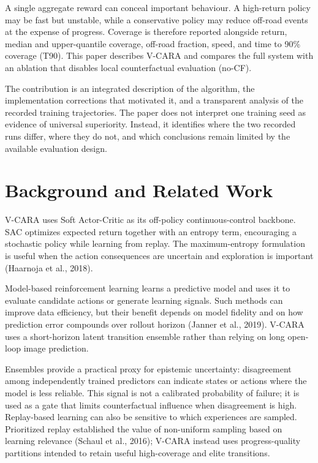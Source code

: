\documentclass[11pt]{article}
\begin{document}
A single aggregate reward can conceal important behaviour. A high-return
policy may be fast but unstable, while a conservative policy may reduce
off-road events at the expense of progress. Coverage is therefore
reported alongside return, median and upper-quantile coverage, off-road
fraction, speed, and time to 90\% coverage (T90). This paper describes
V-CARA and compares the full system with an ablation that disables local
counterfactual evaluation (no-CF).

The contribution is an integrated description of the algorithm, the
implementation corrections that motivated it, and a transparent analysis
of the recorded training trajectories. The paper does not interpret one
training seed as evidence of universal superiority. Instead, it
identifies where the two recorded runs differ, where they do not, and
which conclusions remain limited by the available evaluation design.

\section{Background and Related Work}\label{background-and-related-work}

V-CARA uses Soft Actor-Critic as its off-policy continuous-control
backbone. SAC optimizes expected return together with an entropy term,
encouraging a stochastic policy while learning from replay. The
maximum-entropy formulation is useful when the action consequences are
uncertain and exploration is important (Haarnoja et al., 2018).

Model-based reinforcement learning learns a predictive model and uses it
to evaluate candidate actions or generate learning signals. Such methods
can improve data efficiency, but their benefit depends on model fidelity
and on how prediction error compounds over rollout horizon (Janner et
al., 2019). V-CARA uses a short-horizon latent transition ensemble
rather than relying on long open-loop image prediction.

Ensembles provide a practical proxy for epistemic uncertainty:
disagreement among independently trained predictors can indicate states
or actions where the model is less reliable. This signal is not a
calibrated probability of failure; it is used as a gate that limits
counterfactual influence when disagreement is high. Replay-based
learning can also be sensitive to which experiences are sampled.
Prioritized replay established the value of non-uniform sampling based
on learning relevance (Schaul et al., 2016); V-CARA instead uses
progress-quality partitions intended to retain useful high-coverage and
elite transitions.
\end{document}
